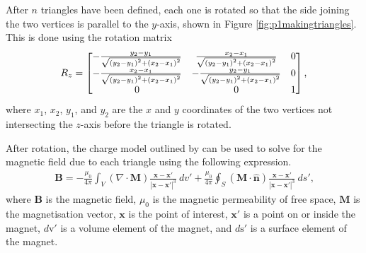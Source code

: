 After \(n\) triangles have been defined, each one is rotated so that the side joining the two vertices is parallel to the \(y\)-axis, shown in Figure \ref{fig:p1makingtriangles}. This is done using the rotation matrix
\begin{equation}
R_z = \begin{bmatrix}
-\frac{y_2-y_1}{\sqrt{\left( y_2-y_1 \right)^2 + \left( x_2-x_1 \right)^2}} & \frac{x_2-x_1}{\sqrt{\left( y_2-y_1 \right)^2 + \left( x_2-x_1 \right)^2}} & 0 \\
-\frac{x_2-x_1}{\sqrt{\left( y_2-y_1 \right)^2 + \left( x_2-x_1 \right)^2}} & -\frac{y_2-y_1}{\sqrt{\left( y_2-y_1 \right)^2 + \left( x_2-x_1 \right)^2}} & 0 \\
0 & 0 & 1
\end{bmatrix} \text{,}\\
\end{equation}
\noindent where \(x_1\), \(x_2\), \(y_1\), and \(y_2\) are the \(x\) and \(y\) coordinates of the two vertices not intersecting the \(z\)-axis before the triangle is rotated.

After rotation, the charge model outlined by \textcite{Furlani2001} can be used to solve for the magnetic field due to each triangle using the following expression.
\begin{eqnarray}\label{eqn:p1chargeB}
\mathbf{B} = -\frac{\mu_0}{4\pi} \int_{V} \left( \nabla \cdot \mathbf{M} \right) \frac{\mathbf{x} - \mathbf{x}'}{\left| \mathbf{x} - \mathbf{x}' \right|^3} \ dv' + \frac{\mu_0}{4\pi} \oint_{S} \left( \mathbf{M} \cdot \hat{\mathbf{n}} \right) \frac{\mathbf{x} - \mathbf{x}'}{\left| \mathbf{x} - \mathbf{x}' \right|^3} \ ds' \text{,}
\end{eqnarray}
\noindent where \(\mathbf{B}\) is the magnetic field, \(\mu_0\) is the magnetic permeability of free space, \(\mathbf{M}\) is the magnetisation vector, \(\mathbf{x}\) is the point of interest, \(\mathbf{x}'\) is a point on or inside the magnet, \(d{\mathrm{v}}'\) is a volume element of the magnet, and \(d{\mathrm{s}}'\) is a surface element of the magnet.

